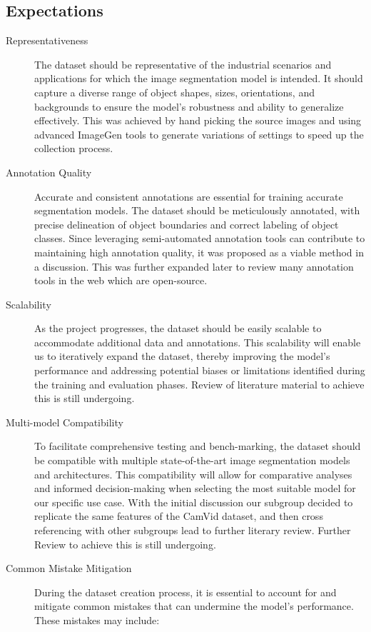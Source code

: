 \subsection{Expectations}
\begin{description}
    \item[Representativeness]
          The dataset should be representative of the industrial scenarios and applications for which the image segmentation model is intended. It should capture a diverse range of object shapes, sizes, orientations, and backgrounds to ensure the model's robustness and ability to generalize effectively. This was achieved by hand picking the source images and using advanced ImageGen tools to generate variations of settings to speed up the collection process.

    \item[Annotation Quality]
          Accurate and consistent annotations are essential for training accurate segmentation models. The dataset should be meticulously annotated, with precise delineation of object boundaries and correct labeling of object classes. Since leveraging semi-automated annotation tools can contribute to maintaining high annotation quality, it was proposed as a viable method in a discussion. This was further expanded later to review many annotation tools in the web which are open-source.

    \item[Scalability]
          As the project progresses, the dataset should be easily scalable to accommodate additional data and annotations. This scalability will enable us to iteratively expand the dataset, thereby improving the model's performance and addressing potential biases or limitations identified during the training and evaluation phases. Review of literature material to achieve this is still undergoing.

    \item[Multi-model Compatibility]
          To facilitate comprehensive testing and bench-marking, the dataset should be compatible with multiple state-of-the-art image segmentation models and architectures. This compatibility will allow for comparative analyses and informed decision-making when selecting the most suitable model for our specific use case. With the initial discussion our subgroup decided to replicate the same features of the CamVid dataset, and then cross referencing with other subgroups lead to further literary review. Further Review to achieve this is still undergoing.

    \item[Common Mistake Mitigation]
          During the dataset creation process, it is essential to account for and mitigate common mistakes that can undermine the model's performance. These mistakes may include:
\end{description}

